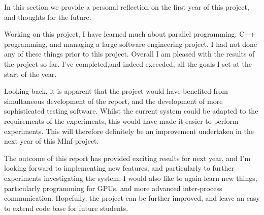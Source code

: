 In this section we provide a personal reflection on the first year of this project, and thoughts for the future.

Working on this project, I have learned much about parallel programming, C++ programming, and managing a large software engineering project. I had not done any of these things prior to this project. Overall I am pleased with the results of the project so far. I've completed,and indeed exceeded, all the goals I set at the start of the year.

Looking back, it is apparent that the project would have benefited from simultaneous development of the report, and the development of more sophisticated testing software. Whilst the current system could be adapted to the requirements of the experiments, this would have made it easier to perform experiments. This will therefore definitely be an improvement undertaken in the next year of this MInf project.

The outcome of this report has provided exciting results for next year, and I'm looking forward to implementing new features, and particularly to further experiments investigating the system. I would also like to again learn new things, particularly programming for GPUs, and more advanced inter-process communication. Hopefully, the project can be further improved, and leave an easy to extend code base for future students.